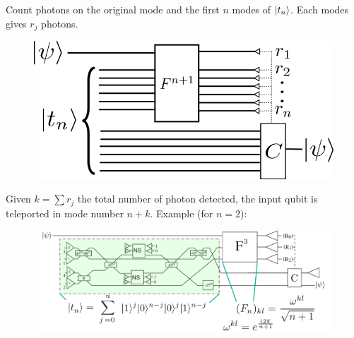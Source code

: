 \documentclass{beamer}
\begin{document}
\begin{frame}
\begin{center}

Count photons on the original mode and the first $n$ modes of $\ket{t_n}$. Each modes gives $r_j$ photons.

\begin{figure}[!htb]
\centering
\includegraphics[scale=.60]{immagini/fourier2.png}
\end{figure}

\end{center}
\end{frame}

\begin{frame}
\begin{center}

Given $k = \sum r_j$ the total number of photon detected, the input qubit is teleported in mode number $n+k$. Example (for $n = 2$):

\begin{figure}[!htb]
\centering
\includegraphics[scale=.20]{immagini/fourier.png}
\end{figure}

\end{center}
\end{frame}
\end{document}

